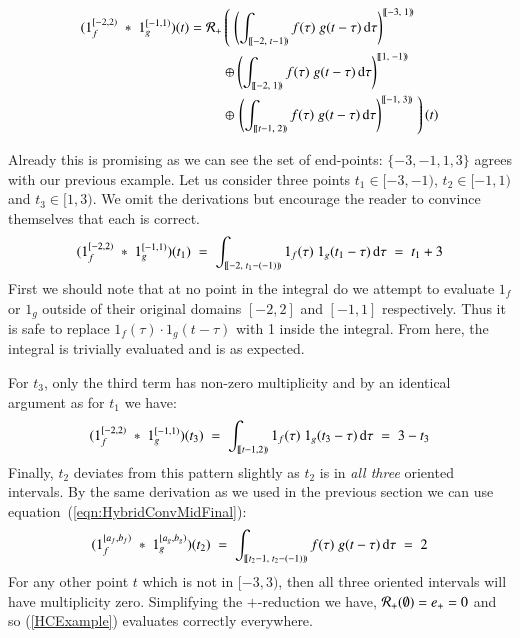 \begin{align}
	\label{HCExample}
	(1_f^{[-2,2)} \;*\; 1_g^{[-1,1)}) (t) = 
		\R[+] &\left( \; \left( 
			\int_{[\![-2,\;t-1)\!)} f(\tau) \; g(t-\tau) \diff\tau \right)^{[\![-3,\; 1)\!)} 
				\right. \notag \\ &\oplus \left( 
			\int_{[\![-2,\;1)\!)} f(\tau) \; g(t-\tau) \diff\tau \right)^{[\![1,\; -1)\!)} 
				\notag \\ &\oplus \left. \left( 
			\int_{[\![t-1,\;2)\!)} f(\tau) \; g(t-\tau) \diff\tau \right)^{[\![-1,\; 3)\!)} 
				\; \right)(t)
\end{align}




Already this is promising as we can see the set of end-points: $\{-3, -1, 1, 3\}$ agrees with our previous example.
Let us consider three points $t_1 \in [-3, -1)$, $t_2 \in [-1, 1)$ and $t_3 \in [1,3)$.
We omit the derivations but encourage the reader to convince themselves that each is correct.
\begin{equation*}
	(1_f^{[-2,2)} \;*\; 1_g^{[-1,1)}) (t_1) 
		\;=\; \int_{[\![-2,\;t_1-(-1))\!)} 1_f(\tau) \; 1_g(t_1-\tau) \diff\tau
		\;=\; t_1 + 3
\end{equation*}
First we should note that at no point in the integral do we attempt to evaluate $1_f$ or $1_g$ outside of their original 
domains $[-2,2]$ and $[-1,1]$ respectively. 
Thus it is safe to replace $1_f(\tau)\cdot 1_g(t-\tau)$ with 1  inside the integral.
From here, the integral is trivially evaluated and is as expected.


For $t_3$, only the third term has non-zero multiplicity and by an identical argument as for $t_1$ we have:
\begin{equation*}
	(1_f^{[-2,2)} \;*\; 1_g^{[-1,1)}) (t_3) 
		\;=\; \int_{[\![t-1,2)\!)} 1_f(\tau) \; 1_g(t_3-\tau) \diff\tau
		\;=\; 3 - t_3
\end{equation*}
Finally, $t_2$ deviates from this pattern slightly as $t_2$ is in \emph{all three} oriented intervals.
By the same derivation as we used in the previous section we can use equation~(\ref{eqn:HybridConvMidFinal}):
\begin{equation*}
	\label{eqn:HCExampleT2}
	(1_f^{[a_f,b_f)} \;*\; 1_g^{[a_g,b_g)}) (t_2) 
		\;=\; \int_{[\![t_2-1,\;t_2-(-1))\!)} f(\tau) \; g(t-\tau) \diff\tau
		\;=\; 2
\end{equation*}
For any other point $t$ which is not in $[-3, 3)$, then all three oriented intervals will have multiplicity zero.
Simplifying the $+$-reduction we have, $\R[+](\emptyset) = e_+ = 0$ and so (\ref{HCExample}) evaluates correctly 
everywhere.




